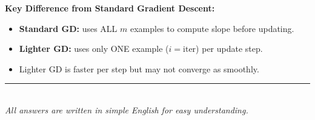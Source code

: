 \documentclass[12pt,a4paper]{article}
\newcommand{\subhead}[1]{\textbf{\textcolor{headerblue}{#1}}}
\begin{document}
\subhead{Key Difference from Standard Gradient Descent:}
\begin{itemize}[leftmargin=*]
    \item \textbf{Standard GD:} uses ALL $m$ examples to compute slope before updating.
    \item \textbf{Lighter GD:} uses only ONE example ($i = \text{iter}$) per update step.
    \item Lighter GD is faster per step but may not converge as smoothly.
\end{itemize}

\vspace{1cm}
\begin{center}
\rule{0.5\textwidth}{0.5pt}\\[6pt]
\textit{All answers are written in simple English for easy understanding.}
\end{center}
\end{document}
